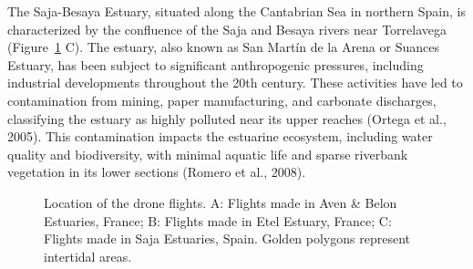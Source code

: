 \documentclass[
  letterpaper,
  DIV=11,
  numbers=noendperiod]{scrartcl}
\begin{document}
The Saja-Besaya Estuary, situated along the Cantabrian Sea in northern
Spain, is characterized by the confluence of the Saja and Besaya rivers
near Torrelavega (Figure~\ref{fig-location_sites} C). The estuary, also
known as San Martín de la Arena or Suances Estuary, has been subject to
significant anthropogenic pressures, including industrial developments
throughout the 20th century. These activities have led to contamination
from mining, paper manufacturing, and carbonate discharges, classifying
the estuary as highly polluted near its upper reaches (Ortega et al.,
2005). This contamination impacts the estuarine ecosystem, including
water quality and biodiversity, with minimal aquatic life and sparse
riverbank vegetation in its lower sections (Romero et al., 2008).

\label{cell-fig-location_sites}
\begin{figure}[H]


\caption{\label{fig-location_sites}Location of the drone flights. A:
Flights made in Aven \& Belon Estuaries, France; B: Flights made in Etel
Estuary, France; C: Flights made in Saja Estuaries, Spain. Golden
polygons represent intertidal areas.}

\end{figure}%
\end{document}
